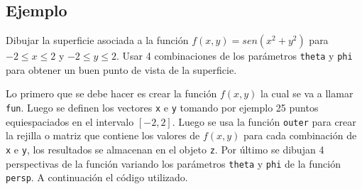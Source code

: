 \documentclass[10pt,]{krantz}
\begin{document}
\subsection*{Ejemplo}\label{ejemplo-19}


Dibujar la superficie asociada a la función \(f(x, y)=sen(x^2+y^2)\)
para \(-2 \leq x \leq2\) y \(-2 \leq y \leq2\). Usar 4 combinaciones de
los parámetros \texttt{theta} y \texttt{phi} para obtener un buen punto
de vista de la superficie.

Lo primero que se debe hacer es crear la función \(f(x, y)\) la cual se
va a llamar \texttt{fun}. Luego se definen los vectores \texttt{x} e
\texttt{y} tomando por ejemplo 25 puntos equiespaciados en el intervalo
\([-2, 2]\). Luego se usa la función \texttt{outer} para crear la
rejilla o matriz que contiene los valores de \(f(x, y)\) para cada
combinación de \texttt{x} e \texttt{y}, los resultados se almacenan en
el objeto \texttt{z}. Por último se dibujan 4 perspectivas de la función
variando los parámetros \texttt{theta} y \texttt{phi} de la función
\texttt{persp}. A continuación el código utilizado.
\end{document}

